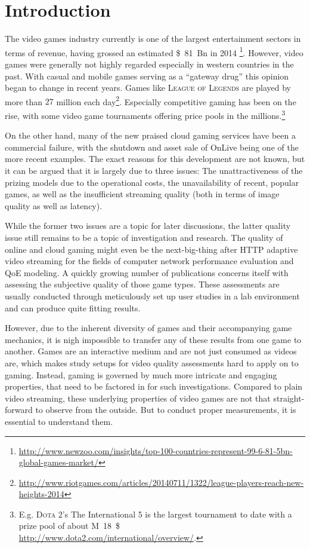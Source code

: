 \section{Introduction}
\label{sec:introduction}


The video games industry currently is one of the largest entertainment sectors in terms of revenue, having grossed an estimated \SI{81}[\$]{Bn} in 2014 \footnote{\url{http://www.newzoo.com/insights/top-100-countries-represent-99-6-81-5bn-global-games-market/}}. However, video games were generally not highly regarded especially in western countries in the past. With casual and mobile games serving as a ``gateway drug'' this opinion began to change in recent years. Games like \textsc{League of Legends} are played by more than $27$ million each day\footnote{\url{http://www.riotgames.com/articles/20140711/1322/league-players-reach-new-heights-2014}}. Especially competitive gaming has been on the rise, with some video game tournaments offering price pools in the millions.\footnote{E.g. \textsc{Dota 2}'s The International 5  is the largest tournament to date with a prize pool of about \SI{18}[M]{\$} \url{http://www.dota2.com/international/overview/}.}

On the other hand, many of the new praised cloud gaming services have been a commercial failure, with the shutdown and asset sale of OnLive being one of the more recent examples. The exact reasons for this development are not known, but it can be argued that it is largely due to three issues: The unattractiveness of the prizing models due to the operational costs, the unavailability of recent, popular games, as well as the insufficient streaming quality (both in terms of image quality as well as latency).

While the former two issues are a topic for later discussions, the latter quality issue still remains to be a topic of investigation and research. The quality of online and cloud gaming might even be the next-big-thing after \acrshort{HTTP} adaptive video streaming for the fields of computer network performance evaluation and \acrshort{QoE} modeling. A quickly growing number of publications concerns itself with assessing the subjective quality of those game types. These assessments are usually conducted through meticulously set up user studies in a lab environment and can produce quite fitting results.

However, due to the inherent diversity of games and their accompanying game mechanics, it is nigh impossible to transfer any of these results from one game to another. Games are an interactive medium and are not just consumed as videos are, which makes study setups for video quality assessments hard to apply on to gaming. Instead, gaming is governed by much more intricate and engaging properties, that need to be factored in for such investigations. Compared to plain video streaming, these underlying properties of video games are not that straight-forward to observe from the outside. But to conduct proper measurements, it is essential to understand them. 

